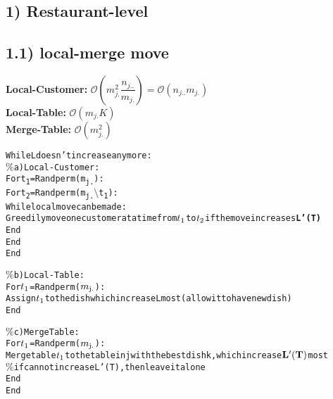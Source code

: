 \documentclass{article}
\begin{document}
\begin{spacing}{1.1}
\section{1) Restaurant-level}
\subsection{1.1) local-merge move}
{\bf Local-Customer:} $\mathcal{O}(m_{j.}^{2}\dfrac{n_{j..}}{m_{j.}})=\mathcal{O}(n_{j..}m_{j.})$\\
{\bf Local-Table:}    $\mathcal{O}(m_{j.}K)$\\ 
{\bf Merge-Table:}    $\mathcal{O}(m_{j.}^{2})$\\
\begin{alltt}
While L doesn't increase any more:    
     \(\%\)a)Local-Customer:
        For t\textsubscript{1}=Randperm(m\textsubscript{j.}):
             For t\textsubscript{2}=Randperm(m\textsubscript{j.}\(\setminus\) t\textsubscript{1}):
                While local move can be made:
                      Greedily move one customer at a time from \(t\textsubscript{1}\) to \(t\textsubscript{2}\) if the move increases {\bf L'(T)} 
                End
             End
        End
     
      \(\%\)b)Local-Table:
        For \(t\textsubscript{1}\)=Randperm(\(m\textsubscript{j.}\)):
            Assign \(t\textsubscript{1}\) to the dish which increase L most(allow it to have new dish)
        End
              
      \(\%\)c)Merge Table:
        For \(t\textsubscript{1}\)=Randperm(\(m\textsubscript{j.}\)):
            Merge table \(t\textsubscript{1}\) to the table in j with the best dish k, which increase \({\bf L'(T)}\) most
            \(\%\)if cannot increase L'(T),then leave it alone
        End
End
\end{alltt}

\end{spacing}
\end{document}
